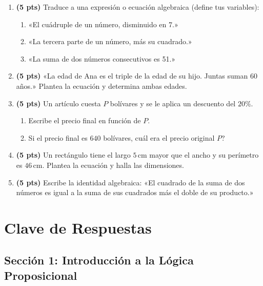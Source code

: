 \documentclass[12pt, letterpaper]{article}
\begin{document}
\begin{enumerate}[leftmargin=*]
  \item \textbf{(5 pts)} Traduce a una expresión o ecuación algebraica (define tus variables):
        \begin{enumerate}[label=\alph*)]
          \item «El cuádruple de un número, disminuido en 7.»
          \item «La tercera parte de un número, más su cuadrado.»
          \item «La suma de dos números consecutivos es 51.»
        \end{enumerate}

  \item \textbf{(5 pts)} «La edad de Ana es el triple de la edad de su hijo. Juntas suman 60 años.» Plantea la ecuación y determina ambas edades.

  \item \textbf{(5 pts)} Un artículo cuesta $P$ bolívares y se le aplica un descuento del $20\%$.
        \begin{enumerate}[label=\alph*)]
          \item Escribe el precio final en función de $P$.
          \item Si el precio final es $640$ bolívares, \textquestiondown cuál era el precio original $P$?
        \end{enumerate}

  \item \textbf{(5 pts)} Un rectángulo tiene el largo $5$\,cm mayor que el ancho y su perímetro es $46$\,cm. Plantea la ecuación y halla las dimensiones.

  \item \textbf{(5 pts)} Escribe la identidad algebraica: «El cuadrado de la suma de dos números es igual a la suma de sus cuadrados más el doble de su producto.»
\end{enumerate}

\newpage

\ifmwclaves
  \section{Clave de Respuestas}

  \subsection*{Sección 1: Introducción a la Lógica Proposicional}
\end{document}
